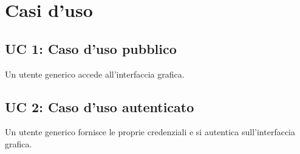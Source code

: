%


\section{Casi d'uso}

\subsection{UC 1: Caso d’uso pubblico}
Un utente generico accede all'interfaccia grafica.
\subsection{UC 2: Caso d'uso autenticato}
Un utente generico fornisce le proprie credenziali e si autentica sull'interfaccia grafica.


